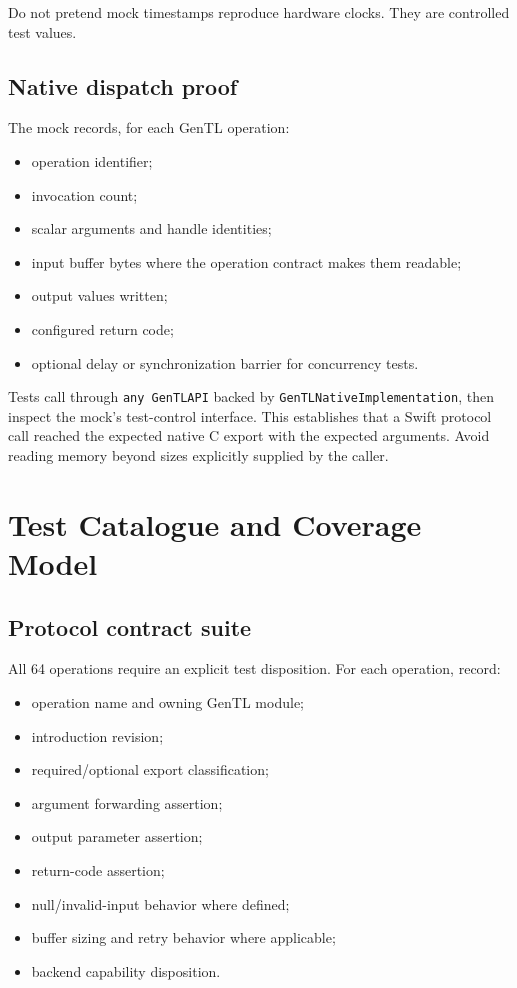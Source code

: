 \documentclass[11pt,a4paper]{report}
\begin{document}
Do not pretend mock timestamps reproduce hardware clocks. They are controlled test values.

\section{Native dispatch proof}
The mock records, for each GenTL operation:
\begin{itemize}
  \item operation identifier;
  \item invocation count;
  \item scalar arguments and handle identities;
  \item input buffer bytes where the operation contract makes them readable;
  \item output values written;
  \item configured return code;
  \item optional delay or synchronization barrier for concurrency tests.
\end{itemize}

Tests call through \texttt{any GenTLAPI} backed by \texttt{GenTLNativeImplementation}, then inspect the mock's test-control interface. This establishes that a Swift protocol call reached the expected native C export with the expected arguments. Avoid reading memory beyond sizes explicitly supplied by the caller.

\chapter{Test Catalogue and Coverage Model}

\section{Protocol contract suite}
All 64 operations require an explicit test disposition. For each operation, record:
\begin{itemize}
  \item operation name and owning GenTL module;
  \item introduction revision;
  \item required/optional export classification;
  \item argument forwarding assertion;
  \item output parameter assertion;
  \item return-code assertion;
  \item null/invalid-input behavior where defined;
  \item buffer sizing and retry behavior where applicable;
  \item backend capability disposition.
\end{itemize}
\end{document}
